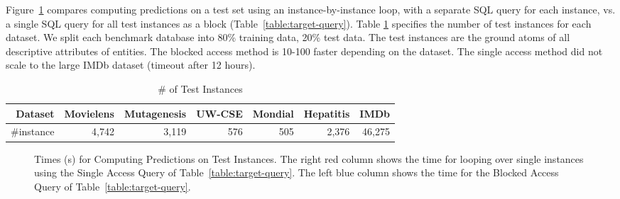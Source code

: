 Figure~\ref{fig:test-timing} compares computing predictions on a test set using an instance-by-instance loop, with a separate SQL query for each instance, vs. a single SQL query for all test instances as a block (Table~\ref{table:target-query}). Table \ref{tab:test-instance} specifies the number of  test instances for each dataset. We split each benchmark database into  80\% training data, 20\% test data. The test instances are the ground atoms of all descriptive attributes of entities.  The blocked access method is 10-100 faster depending on the dataset. The single access method did not scale to the large IMDb dataset (timeout after 12 hours).

\begin{table}[htbp]
\caption{\# of Test Instances }
  \centering
  \begin{tabular}{|r|r|r|r|r|r|r|} \hline
\textbf{Dataset}&Movielens&	Mutagenesis	& 	UW-CSE	&	Mondial&	Hepatitis&	 	IMDb \\ \hline
{\#instance}	&4,742	 	&	3,119		&576	&		505&2,376	 	&46,275 \\ \hline
    
\end{tabular}%
  \label{tab:test-instance}%
\end{table}%

\begin{figure}[htbp] %
 \centering
{} 
\caption{Times (s) for Computing Predictions on Test Instances. The right red column shows the time for looping over single instances using the Single Access Query of Table~\ref{table:target-query}. The left blue column shows the time for the Blocked Access Query of Table~\ref{table:target-query}.
}
 \label{fig:test-timing}
\end{figure}

